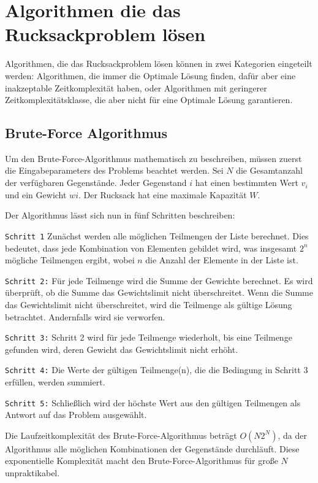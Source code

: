 
\chapter{Algorithmen die das Rucksackproblem lösen}
Algorithmen, die das Rucksackproblem lösen können in zwei Kategorien 
eingeteilt werden: Algorithmen, die immer die Optimale Lösung finden, 
dafür aber eine inakzeptable Zeitkomplexität haben, 
oder Algorithmen mit geringerer Zeitkomplexitätsklasse, die 
aber nicht für eine Optimale Lösung garantieren.

\section{Brute-Force Algorithmus}
Um den Brute-Force-Algorithmus mathematisch zu beschreiben, 
müssen zuerst die Eingabeparameters des Problems beachtet werden. Sei 
$N$ die Gesamtanzahl der verfügbaren Gegenstände. Jeder 
Gegenstand $i$ hat einen bestimmten Wert $v_i$ und ein Gewicht $wi$. 
Der Rucksack hat eine maximale Kapazität $W$.

Der Algorithmus lässt sich nun in fünf Schritten beschreiben:

\texttt{Schritt 1}
Zunächst werden alle möglichen Teilmengen der Liste berechnet. 
Dies bedeutet, dass jede Kombination von Elementen gebildet 
wird, was insgesamt $2^n$ mögliche Teilmengen ergibt, wobei $n$ 
die Anzahl der Elemente in der Liste ist.

\texttt{Schritt 2:}
Für jede Teilmenge wird die Summe der Gewichte berechnet. 
Es wird überprüft, ob die Summe das Gewichtslimit nicht 
überschreitet. Wenn die Summe das Gewichtslimit nicht 
überschreitet, wird die Teilmenge als gültige Lösung 
betrachtet. Andernfalls wird sie verworfen.

\texttt{Schritt 3:}
Schritt 2 wird für jede Teilmenge wiederholt, bis eine 
Teilmenge gefunden wird, deren Gewicht das Gewichtslimit 
nicht erhöht.

\texttt{Schritt 4:}
Die Werte der gültigen Teilmenge(n), die die Bedingung in 
Schritt 3 erfüllen, werden summiert.

\texttt{Schritt 5:}
Schließlich wird der höchste Wert aus den gültigen 
Teilmengen als Antwort auf das Problem ausgewählt.\ \cite[vgl.]{balogun2022explanatory}

Die Laufzeitkomplexität des Brute-Force-Algorithmus beträgt 
$O(N2^N)$, da der Algorithmus alle möglichen Kombinationen der 
Gegenstände durchläuft. Diese exponentielle Komplexität 
macht den Brute-Force-Algorithmus für große $N$ unpraktikabel.\ \cite[vlg.]{hristakeva2005different}

